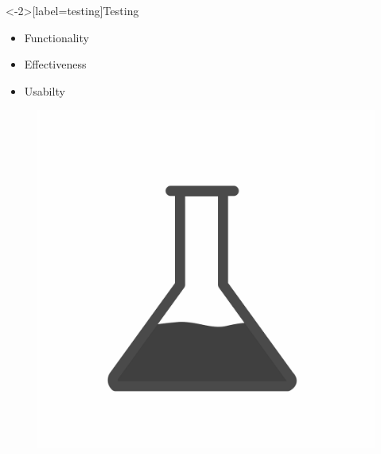 \documentclass[aspectratio=169]{beamer}
[aspectratio=169] %
\begin{document}
\begin{frame}<-2>[label=testing]{Testing}
  \begin{minipage}{0.49\textwidth} 
    \begin{itemize}
      \item<1-> Functionality
      \item<2-> Effectiveness
      \item<3-> Usabilty
    \end{itemize}
  \end{minipage}
  \hfill
  \begin{minipage}{0.49\textwidth} 
    \begin{figure}
      \centering
      \includegraphics[height=0.5\textheight]{figures/test-tube.png}
    \end{figure}
  \end{minipage}
\end{frame}
\end{document}
